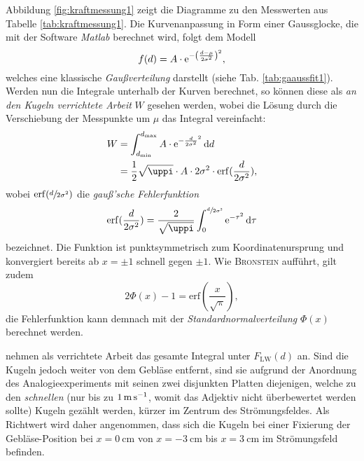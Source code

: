 \noindent Abbildung \ref{fig:kraftmessung1} zeigt die Diagramme zu den Messwerten aus Tabelle \ref{tab:kraftmessung1}. Die Kurvenanpassung in Form einer Gaussglocke, die mit der Software \textit{Matlab} berechnet wird, folgt dem Modell
\begin{equation}
\label{eq:gebl1}
f(d)=A\cdot \operatorname{e}^{-\left(\frac{d-\mu}{2\sigma^2}\right)^2},
\end{equation}
welches eine klassische \textit{Gaußverteilung} darstellt (siehe Tab. \ref{tab:gaaussfit1}). Werden nun die Integrale unterhalb der Kurven berechnet, so können diese als \textit{an den Kugeln verrichtete Arbeit} $W$ gesehen werden, wobei die Lösung durch die Verschiebung der Messpunkte um $\mu$ das Integral vereinfacht:
\begin{equation}
\label{eq:gebl2}
\begin{alignedat}{2}
 W & = \int_{d_\mathrm{min}}^{d_\mathrm{max}}A\cdot \e^{-\frac{d}{2\sigma^2}^2}\mathrm{d}d\\
 & = \frac{1}{2}\sqrt{\uppi}\cdot A\cdot 2\sigma^2 \cdot \mathrm{erf}(\frac{d}{2\sigma^2}),
\end{alignedat}
\end{equation}
wobei $\mathrm{erf}(\sfrac{d}{2\sigma^2})$ die \textit{gauß'sche Fehlerfunktion}
\begin{equation}
\mathrm{erf}(\frac{d}{2\sigma^2})=\frac{2}{\sqrt{\uppi}}\int_{0}^{\sfrac{d}{2\sigma^2}}\e^{-\tau^2}\mathrm{d}\tau
\end{equation}
bezeichnet. Die Funktion ist punktsymmetrisch zum Koordinatenursprung und konvergiert bereits ab $x=\pm 1$ schnell gegen $\pm 1$. Wie \textsc{Bronstein} aufführt, gilt zudem 
\begin{equation}
2\Phi (x)-1=\mathrm{erf}(\frac{x}{\sqrt{\uppi}}),
\end{equation} 
die Fehlerfunktion kann demnach mit der \textit{Standardnormalverteilung} $\Phi(x)$ berechnet werden.



\noindent\textcite{Schilling1987} nehmen als verrichtete Arbeit das gesamte Integral unter $F_\mathrm{LW}(d)$ an. Sind die Kugeln jedoch weiter von dem Gebläse entfernt, sind sie aufgrund der Anordnung des Analogieexperiments mit seinen zwei disjunkten Platten diejenigen, welche zu den \textit{schnellen} (nur bis zu $\SI[fraction-function=\sfrac]{1}{\metre\per\second}$, womit das Adjektiv nicht überbewertet werden sollte) Kugeln gezählt werden, kürzer im Zentrum des Strömungsfeldes. 
Als Richtwert wird daher angenommen, dass sich die Kugeln bei einer Fixierung der Gebläse-Position bei $x=\SI{0}{\centi\metre}$ von $x=-\SI{3}{\centi\metre}$ bis $x=\SI{3}{\centi\metre}$ im Strömungsfeld befinden.


